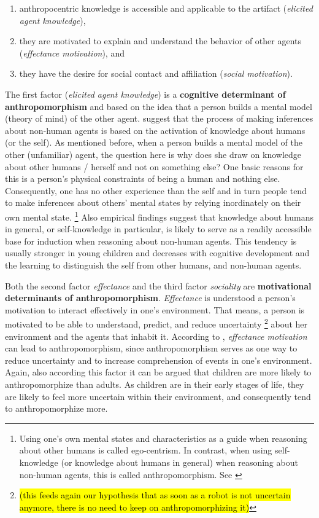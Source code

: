 \documentclass{frontiersSCNS} %
\begin{document}
\begin{enumerate}
	\item anthropocentric knowledge is accessible and applicable to the artifact (\textit{elicited agent knowledge}),
	\item they are motivated to explain and understand the behavior of other agents (\textit{effectance motivation}), and
	\item they have the desire for social contact and affiliation (\textit{social motivation}).
\end{enumerate}

The first factor (\textit{elicited agent knowledge}) is a \textbf{cognitive determinant of anthropomorphism} and based on the idea that a person builds a mental model (theory of mind) of the other agent. \cite{epley_seeing_2007} suggest that the process of making inferences about non-human agents is based on the activation of knowledge about humans (or the self). As mentioned before, when a person builds a mental model of the other (unfamiliar) agent, the question here is why does she draw on knowledge about other humans / herself and not on something else? One basic reasons for this is a person's physical constraints of being a human and nothing else. Consequently, one has no other experience than the self and in turn people tend to make inferences about others' mental states by relying inordinately on their own mental state. \footnote{Using one's own mental states and characteristics as a guide when reasoning about other humans is called ego-centrism. In contrast, when using self-knowledge (or knowledge about humans in general) when reasoning about non-human agents, this is called anthropomorphism. See \cite{epley_seeing_2007}} Also empirical findings suggest that knowledge about humans in general, or self-knowledge in particular, is likely to serve as a readily accessible base for induction when reasoning about non-human agents. This tendency is usually stronger in young children and decreases with cognitive development and the learning to distinguish the self from other humans, and non-human agents. 
	
Both the second factor \textit{effectance} and the third factor \textit{sociality} are \textbf{motivational determinants of anthropomorphism}. \textit{Effectance} is understood a person's motivation to interact effectively in one's environment. That means, a person is motivated to be able to understand, predict, and reduce uncertainty \footnote{\hl{(this feeds again our hypothesis that as soon as a robot is not uncertain anymore, there is no need to keep on anthropomorphizing it)}} about her environment and the agents that inhabit it. According to \cite{epley_seeing_2007}, \textit{effectance motivation} can lead to anthropomorphism, since anthropomorphism serves as one way to reduce uncertainty and to increase comprehension of events in one's environment. Again, also according this factor it can be argued that children are more likely to anthropomorphize than adults. As children are in their early stages of life, they are likely to feel more uncertain within their environment, and consequently tend to anthropomorphize more.
\end{document}
